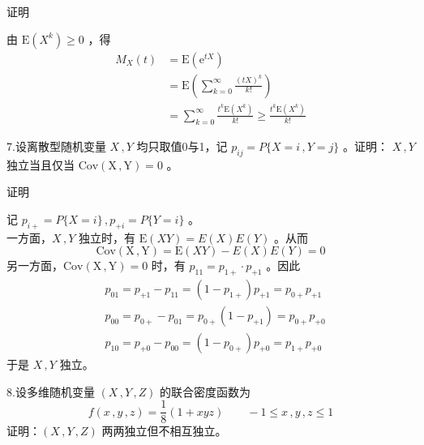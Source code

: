 \documentclass[12pt,hyperref,]{ctexart}
\begin{document}
\vspace{1em}

\heiti

证明

\songti

由 \(\mathrm{E}(X^k)\ge 0\) ，得 \begin{equation*}
\begin{aligned}
M_X(t)&=\mathrm{E}(\mathrm{e}^{tX}) \\
&=\mathrm{E}\left(\sum_{k=0}^{\infty}\frac{(tX)^k}{k!}\right) \\
&=\sum_{k=0}^{\infty}\frac{t^k\mathrm{E}(X^k)}{k!}\ge \frac{t^k\mathrm{E}(X^k)}{k!}
\end{aligned}
\end{equation*}

\vspace{3em}

\kaishu

7.设离散型随机变量 \(X\, ,Y\) 均只取值0与1，记
\(p_{ij}=P\{X=i\, ,Y=j\}\) 。证明： \(X\, ,Y\) 独立当且仅当
\(\mathrm{Cov(X\, ,Y)}=0\) 。

\vspace{1em}

\heiti

证明

\songti

记 \(p_{i+}=P\{X=i\}\, ,p_{+i}=P\{Y=i\}\) 。\\
一方面，\(X\, ,Y\) 独立时，有 \(\mathrm{E}(XY)=E(X)E(Y)\) 。从而
\begin{equation*}
\mathrm{Cov(X\, ,Y)}=\mathrm{E}(XY)-E(X)E(Y)=0
\end{equation*} 另一方面，\(\mathrm{Cov(X\, ,Y)}=0\) 时，有
\(p_{11}=p_{1+}\cdot p_{+1}\) 。因此 \begin{equation*}
\begin{aligned}
& p_{01}=p_{+1}-p_{11}=(1-p_{1+})p_{+1}=p_{0+}p_{+1} \\
& p_{00}=p_{0+}-p_{01}=p_{0+}(1-p_{+1})=p_{0+}p_{+0} \\
& p_{10}=p_{+0}-p_{00}=(1-p_{0+})p_{+0}=p_{1+}p_{+0} 
\end{aligned}
\end{equation*}于是 \(X\, ,Y\) 独立。

\vspace{3em}

\kaishu

8.设多维随机变量 \((X\, ,Y\, ,Z)\) 的联合密度函数为 \begin{equation*}
f(x\, ,y\, ,z)=\frac 18 (1+xyz) \qquad -1\le x\, ,y\, ,z\le 1
\end{equation*}证明：\((X\, ,Y\, ,Z)\) 两两独立但不相互独立。
\end{document}

